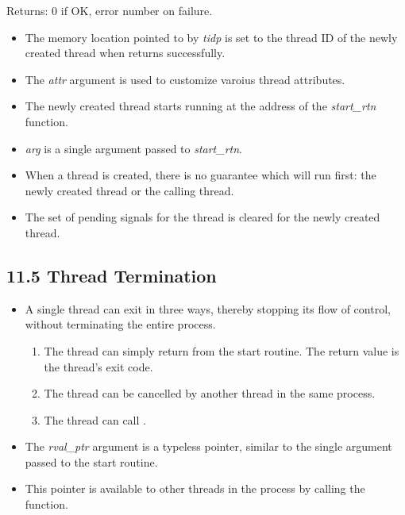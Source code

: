 \documentclass[]{article}
\begin{document}
Returns: 0 if OK, error number on failure.

\begin{itemize}
\item The memory location pointed to by \emph{tidp} is set to the thread ID of
the newly created thread when  returns successfully.
\item The \emph{attr} argument is used to customize varoius thread attributes.
\item The newly created thread starts running at the address of the
\emph{start\_rtn} function.
\item \emph{arg} is a single argument passed to \emph{start\_rtn}.
\item When a thread is created, there is no guarantee which will run first: the
newly created thread or the calling thread.
\item The set of pending signals for the thread is cleared for the newly created
thread.
\end{itemize}

\subsection*{11.5 Thread Termination}
\begin{itemize}
\item  A single thread can exit in three ways, thereby stopping its flow of
control, without terminating the entire process.
\begin{enumerate}
\item The thread can simply return from the start routine. The return value is
the thread's exit code.
\item The thread can be cancelled by another thread in the same process.
\item The thread can call .
\end{enumerate}
\end{itemize}



\begin{itemize}
\item The \emph{rval\_ptr} argument is a typeless pointer, similar to the single
argument passed to the start routine.
\item This pointer is available to other threads in the process by calling the
 function.
\end{itemize}
\end{document}
